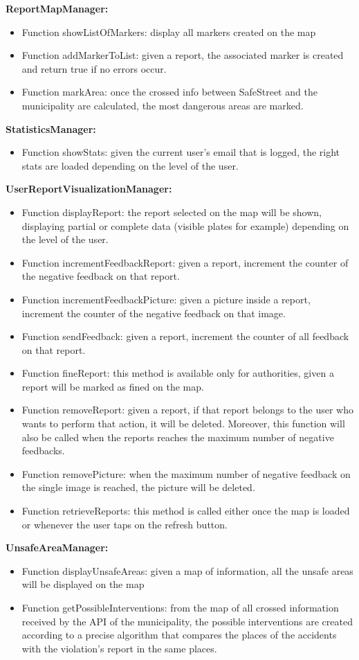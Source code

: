 \documentclass[../RASD.tex]{subfiles}
\begin{document}
    \textbf{ReportMapManager:}
    \begin{itemize}
        \item     Function showListOfMarkers: display all markers created on the map
        \item     Function addMarkerToList: given a report, the associated marker is created and return true if no errors occur.
        \item     Function markArea: once the crossed info between SafeStreet and the municipality are calculated, the most dangerous areas are marked.
    \end{itemize}
    \textbf{StatisticsManager:}
    \begin{itemize}
        \item     Function showStats: given the current user’s email that is logged, the right stats are loaded depending on the level of the user.
    \end{itemize}
    \textbf{UserReportVisualizationManager:}
    \begin{itemize}
        \item     Function displayReport: the report selected on the map will be shown, displaying partial or complete data (visible plates for example) depending on the level of the user.
        \item     Function incrementFeedbackReport: given a report, increment the counter of the negative feedback on that report.
        \item     Function incrementFeedbackPicture: given a picture inside a report, increment the counter of the negative feedback on that image.
        \item     Function sendFeedback: given a report, increment the counter of all feedback on that report.
        \item     Function fineReport: this method is available only for authorities, given a report will be marked as fined on the map.
        \item     Function removeReport: given a report, if that report belongs to the user who wants to perform that action, it will be deleted. Moreover, this function will also be called when the reports reaches the maximum number of negative feedbacks.
        \item     Function removePicture: when the maximum number of negative feedback on the single image is reached, the picture will be deleted.
        \item     Function retrieveReports: this method is called either once the map is loaded or whenever the user taps on the refresh button.
    \end{itemize}
    \textbf{UnsafeAreaManager:}
    \begin{itemize}
        \item     Function displayUnsafeAreas: given a map of information, all the unsafe areas will be displayed on the map
        \item     Function getPossibleInterventions: from the map of all crossed information received by the API of the municipality, the possible interventions are created according to a precise algorithm that compares the places of the accidents with the violation’s report in the same places.
    \end{itemize}
    \newpage
\end{document}
